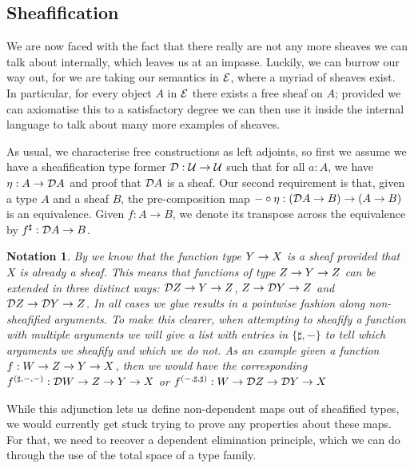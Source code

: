 \documentclass[11pt]{article}
\newtheorem{nota}[thrm]{Notation}
\begin{document}
\subsection{Sheafification}%
\label{sub:sheafification-internal}

We are now faced with the fact that there really are not any more sheaves we
can talk about internally, which leaves us at an impasse.
%
Luckily, we can burrow our way out, for we are taking our semantics in \(\mathcal{E}\),
where a myriad of sheaves exist.
%
In particular, for every object \(A\) in \(\mathcal{E}\) there exists a free sheaf on
\(A\); provided we can axiomatise this to a satisfactory degree we can then use
it inside the internal language to talk about many more examples of sheaves.

As usual, we characterise free constructions as left adjoints, so first we
assume we have a sheafification type former
\(\mathcal{D} : \mathcal{U} \to \mathcal{U}\) such that for all \(a : A\), we have
\(\eta : A \to \mathcal{D}{A}\) and proof that \(\mathcal{D}{A}\) is a sheaf.
%
Our second requirement is that, given a type \(A\) and a sheaf \(B\), the
pre-composition map
\(-\circ\eta : (\mathcal{D}{A} \to B) \to (A \to B)\) is an equivalence.
%
Given \(f : A \to B\), we denote its transpose across the equivalence by
\({f}^\sharp : \mathcal{D}{A} \to B\).

\begin{nota}
  By  we know that the function type
  \({{Y}\to{X}}\) is a sheaf provided that \(X\) is already a sheaf.
  This means that functions of type \({{Z}\to{{{Y}\to{Z}}}}\) can be extended in
  three distinct ways: \({{\mathcal{D}{Z}}\to{{{Y}\to{Z}}}}\),
  \({{Z}\to{{{\mathcal{D}{Y}}\to{Z}}}}\) and
  \({{\mathcal{D}{Z}}\to{{{\mathcal{D}{Y}}\to{Z}}}}\).
  In all cases we glue results in a pointwise fashion along non-sheafified
  arguments.
  To make this clearer, when attempting to sheafify a function
  with multiple arguments we will give a list with entries in \(\{\sharp,-\}\)
  to tell which arguments we sheafify and which we do not.
  As an example given a function \(f : {{W}\to{{{Z}\to{{{Y}\to{X}}}}}}\), then
  we would have the corresponding
  \({f}^{({\sharp,-,-})}: {{\mathcal{D}{W}}\to{{{Z}\to{{{Y}\to{X}}}}}}\)
  or
  \({f}^{({-,\sharp,\sharp})}: {{W}\to{{{\mathcal{D}{Z}}\to{{{\mathcal{D}{Y}}\to{X}}}}}}\)
\end{nota}

While this adjunction lets us define non-dependent maps out of sheafified
types, we would currently get stuck trying to prove any properties
about these maps.
%
For that, we need to recover a dependent elimination principle, which we
can do through the use of the total space of a type family.
\end{document}
